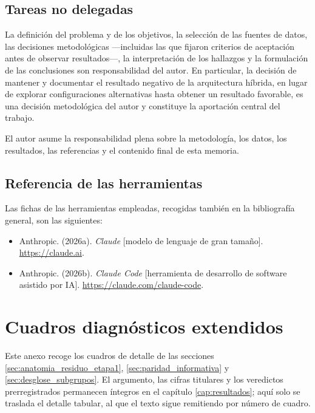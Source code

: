 \begin{sloppypar}
\section{Tareas no delegadas}\label{sec:ia_no_delegadas}

La definición del problema y de los objetivos, la selección de las fuentes de datos, las
decisiones metodológicas ---incluidas las que fijaron criterios de aceptación antes de
observar resultados---, la interpretación de los hallazgos y la formulación de las
conclusiones son responsabilidad del autor. En particular, la decisión de mantener y
documentar el resultado negativo de la arquitectura híbrida, en lugar de explorar
configuraciones alternativas hasta obtener un resultado favorable, es una decisión
metodológica del autor y constituye la aportación central del trabajo.

El autor asume la responsabilidad plena sobre la metodología, los datos, los resultados,
las referencias y el contenido final de esta memoria.

\section{Referencia de las herramientas}\label{sec:ia_referencias}

Las fichas de las herramientas empleadas, recogidas también en la bibliografía general,
son las siguientes:

\begin{itemize}[nosep]
  \item Anthropic. (2026a). \emph{Claude} [modelo de lenguaje de gran tamaño].
    \url{https://claude.ai}.
  \item Anthropic. (2026b). \emph{Claude Code} [herramienta de desarrollo de software
    asistido por IA]. \url{https://claude.com/claude-code}.
\end{itemize}

\end{sloppypar}


\chapter{Cuadros diagnósticos extendidos}\label{cap:anexo5}

Este anexo recoge los cuadros de detalle de las secciones \ref{sec:anatomia_residuo_etapa1},
\ref{sec:paridad_informativa} y \ref{sec:desglose_subgrupos}. El argumento, las cifras
titulares y los veredictos prerregistrados permanecen íntegros en el capítulo
\ref{cap:resultados}; aquí solo se traslada el detalle tabular, al que el texto sigue
remitiendo por número de cuadro.


